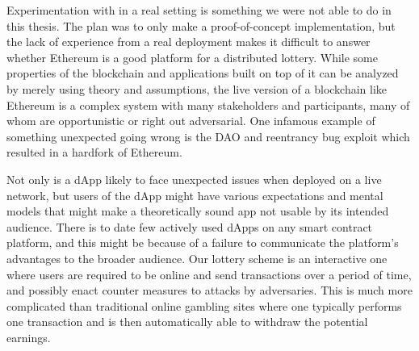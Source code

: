 Experimentation with in a real setting is something we were not able to do in this thesis. The plan was to only make a proof-of-concept implementation, but the lack of experience from a real deployment makes it difficult to answer whether Ethereum is a good platform for a distributed lottery. While some properties of the blockchain and applications built on top of it can be analyzed by merely using theory and assumptions, the live version of a blockchain like Ethereum is a complex system with many stakeholders and participants, many of whom are opportunistic or right out adversarial. One infamous example of something unexpected going wrong is the DAO and reentrancy bug exploit which resulted in a hardfork of Ethereum. 

Not only is a dApp likely to face unexpected issues when deployed on a live network, but users of the dApp might have various expectations and mental models that might make a theoretically sound app not usable by its intended audience. There is to date few actively used dApps on any smart contract platform, and this might be because of a failure to communicate the platform's advantages to the broader audience. Our lottery scheme is an interactive one where users are required to be online and send transactions over a period of time, and possibly enact counter measures to attacks by adversaries. This is much more complicated than traditional online gambling sites where one typically performs one transaction and is then automatically able to withdraw the potential earnings. 
